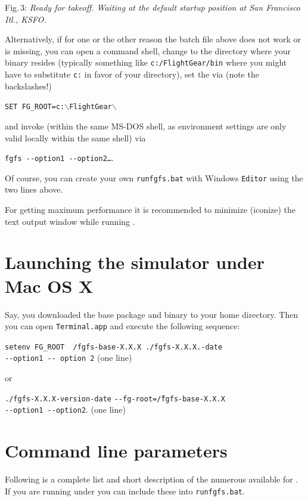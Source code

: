  \noindent
Fig.\,3: \textit{Ready for takeoff. Waiting at the default startup position at San
Francisco Itl., KSFO.}
\medskip

Alternatively, if for one or the other reason the batch file above does not work or is missing,
you can open a command shell, change to the directory where your binary resides
(typically something like \texttt{c:/FlightGear/bin} where you might have to substitute
\texttt{c:} in favor of your \FlightGear{} directory), set the  via (note the backslashes!)
 \medskip

\texttt{SET FG\_ROOT=c:$\backslash$FlightGear$\backslash$}
 \medskip

\noindent
 and invoke \FlightGear{} (within the same MS-DOS shell, as environment
 settings are only valid locally within the same shell) via
  \medskip

\texttt{fgfs -$ $-option1 -$ $-option2\dots}.
 \medskip

Of course,  you can create your own \texttt{runfgfs.bat} with Windows \texttt{Editor} using the
two lines above.

For getting maximum performance it is recommended to minimize (iconize) the text output
window while running \FlightGear{}$\!$.

\section{Launching the simulator under Mac OS X}
Say, you downloaded the base package and binary to your home directory. Then you can open \texttt{Terminal.app} and execute the following sequence:
\medskip

\noindent
\texttt{setenv FG\_ROOT ~/fgfs-base-X.X.X ./fgfs-X.X.X.-date}\\
\texttt{-$ $-option1 -$ $- option 2} (one line)
\medskip

\noindent
or
\medskip

\noindent
\texttt{./fgfs-X.X.X-version-date}
 \texttt{-$ $-fg-root=\~/fgfs-base-X.X.X}\\
 \texttt{-$ $-option1 -$ $-option2}. (one line)

\section{Command line parameters\label{options}}
Following is a complete list and short description of the numerous 
available for \FlightGear{}$\!$. If you are running \FlightGear{} under  you can include these into
\texttt{runfgfs.bat}.

